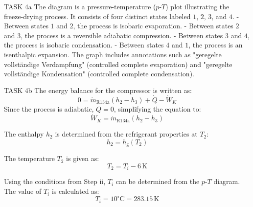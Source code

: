 TASK 4a  
The diagram is a pressure-temperature (\( p \)-\( T \)) plot illustrating the freeze-drying process. It consists of four distinct states labeled \( 1 \), \( 2 \), \( 3 \), and \( 4 \).  
- Between states \( 1 \) and \( 2 \), the process is isobaric evaporation.  
- Between states \( 2 \) and \( 3 \), the process is a reversible adiabatic compression.  
- Between states \( 3 \) and \( 4 \), the process is isobaric condensation.  
- Between states \( 4 \) and \( 1 \), the process is an isenthalpic expansion.  
The graph includes annotations such as "geregelte vollständige Verdampfung" (controlled complete evaporation) and "geregelte vollständige Kondensation" (controlled complete condensation).  

TASK 4b  
The energy balance for the compressor is written as:  
\[
0 = \dot{m}_{\text{R134a}} (h_2 - h_3) + \dot{Q} - \dot{W}_K  
\]  
Since the process is adiabatic, \( \dot{Q} = 0 \), simplifying the equation to:  
\[
\dot{W}_K = \dot{m}_{\text{R134a}} (h_2 - h_3)  
\]  

The enthalpy \( h_2 \) is determined from the refrigerant properties at \( T_2 \):  
\[
h_2 = h_{\text{g}}(T_2)  
\]  

The temperature \( T_2 \) is given as:  
\[
T_2 = T_i - 6 \, \text{K}  
\]  

Using the conditions from Step ii, \( T_i \) can be determined from the \( p \)-\( T \) diagram. The value of \( T_i \) is calculated as:  
\[
T_i = 10^\circ\text{C} = 283.15 \, \text{K}  
\]